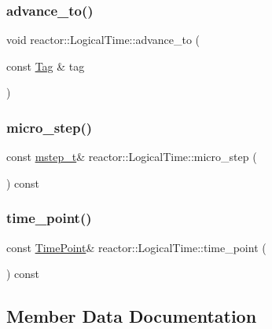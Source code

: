 \subsubsection{\texorpdfstring{advance\+\_\+to()}{advance\_to()}}
{\footnotesize\ttfamily void reactor\+::\+Logical\+Time\+::advance\+\_\+to (\begin{DoxyParamCaption}\item[{const \hyperlink{classreactor_1_1Tag}{Tag} \&}]{tag }\end{DoxyParamCaption})}

\mbox{\label{classreactor_1_1LogicalTime_a59d2ded3742c8bcec0d9af22a45bd133}} 
\subsubsection{\texorpdfstring{micro\+\_\+step()}{micro\_step()}}
{\footnotesize\ttfamily const \hyperlink{namespacereactor_aaea1189d617982457b74127ba74a7340}{mstep\+\_\+t}\& reactor\+::\+Logical\+Time\+::micro\+\_\+step (\begin{DoxyParamCaption}{ }\end{DoxyParamCaption}) const\hspace{0.3cm}{\ttfamily [inline]}}

\mbox{\label{classreactor_1_1LogicalTime_a94567626de1241161edfb41c34d6b09e}} 
\subsubsection{\texorpdfstring{time\+\_\+point()}{time\_point()}}
{\footnotesize\ttfamily const \hyperlink{namespacereactor_ad950f8d1a46612500286a4af0f167080}{Time\+Point}\& reactor\+::\+Logical\+Time\+::time\+\_\+point (\begin{DoxyParamCaption}{ }\end{DoxyParamCaption}) const\hspace{0.3cm}{\ttfamily [inline]}}



\subsection{Member Data Documentation}
\mbox{\label{classreactor_1_1LogicalTime_a54b9d7e8cd2af3523b92efbbac1969e9}} 
